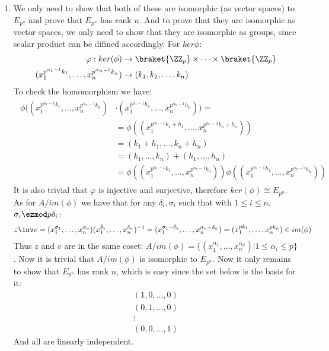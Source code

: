 \begin{enumerate}[label=\ilabel]
    \item 
        We only need to show that both of these are isomorphic (as vector spaces) to $E_{p^n}$ and prove that $E_{p^n}$ has rank $n$. And to prove that they are isomorphic as vector spaces, we only need to show that they are isomorphic as groups, since scalar product can be difined accordingly. For $ker \phi$:
        \begin{equation*}
            \begin{split}
                \varphi: ker(\phi) & \to \braket{\ZZ_p} \times \dots \times \braket{\ZZ_p} \\
                (x_1^{p^{\alpha_1 - 1} k_1}, \dots, x_n^{p^{\alpha_n - 1} k_n}) & \to (k_1, k_2, \dots, k_n)
            \end{split}
        \end{equation*}
        To check the homomorphism we have:
        \begin{gather*}
            \begin{split}
                \phi((x_1^{p^{\alpha_1 - 1} k_1}, \dots, x_n^{p^{\alpha_n - 1} k_n}) &\cdot (x_1^{p^{\alpha_1 - 1} h_1}, \dots, x_n^{p^{\alpha_n - 1} h_n})) =\\ & = \phi((x_1^{p^{\alpha_1 - 1} k_1 + h_1}, \dots, x_n^{p^{\alpha_n - 1} k_n + h_n})) \\
                &= (k_1 + h_1, \dots, k_n + h_n) \\
                &= (k_1, \dots, k_n) + (h_1, \dots, h_n) \\
                &= \phi((x_1^{p^{\alpha_1 - 1} k_1}, \dots, x_n^{p^{\alpha_n - 1} k_n})) \phi((x_1^{p^{\alpha_1 - 1} h_1}, \dots, x_n^{p^{\alpha_n - 1} h_n}))
            \end{split}
        \end{gather*}
        It is also trivial that $\varphi$ is injective and surjective, therefore $ker(\phi) \cong E_{p^n}$. \\
        As for $A/im(\phi)$ we have that for any $\delta_i, \sigma_i$ such that with $1 \le i \le n$, $\sigma_i \ezmod p \delta_i$:
        \begin{gather*}
            z\inv v = (x_1^{\sigma_1}, \dots, x_n^{\sigma_n}) (x_1^{\delta_1}, \dots, x_n^{\delta_n})^{-1} = (x_1^{\sigma_1 - \delta_1}, \dots, x_n^{\sigma_n - \delta_n}) = (x_1^{pk_1}, \dots, x_n^{pk_n}) \in im(\phi)
        \end{gather*}
        Thus $z$ and $v$ are in the same coset: $A/im(\phi) = \{(x_1^{\alpha_1}, \dots, x_n^{\alpha_n}) | 1 \le \alpha_i \le p \}$. Now it is trivial that $A/im(\phi)$ is isomorphic to $E_{p^n}$. Now it only remains to show that $E_{p^n}$ has rank $n$, which is easy since the set below is the basis for it:
        \begin{gather*}
            (1, 0, \dots, 0) \\
            (0, 1, \dots, 0) \\
            \vdots \\
            (0, 0, \dots, 1)
        \end{gather*}
        And all are linearly independent.
\end{enumerate}
    
    